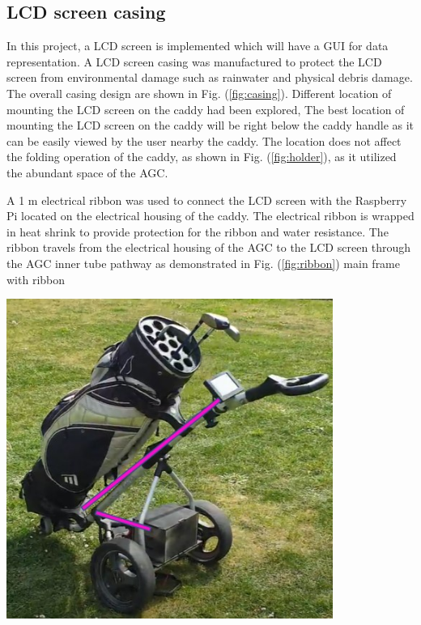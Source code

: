 \documentclass[11pt,landscape]{article}
\newenvironment{Figure}
  {\par\medskip\noindent\minipage{\linewidth}}
  {\endminipage\par\medskip}
\begin{document}
\begin{multicols}{3}
    \subsection{LCD screen casing}
    In this project, a LCD screen is implemented which will have a GUI for data
    representation. A LCD screen casing was manufactured to protect the LCD
    screen from environmental damage such as rainwater and physical debris
    damage. The overall casing design are shown in Fig. (\ref{fig:casing}).
    Different location of mounting the LCD screen on the caddy had been
    explored, The best location of mounting the LCD screen on the caddy will be
    right below the caddy handle as it can be easily viewed by the user nearby
    the caddy. The location does not affect the folding operation of the caddy,
    as shown in Fig. (\ref{fig:holder}), as it utilized the abundant space of
    the AGC. 
    
    A 1 m electrical ribbon was used to connect the LCD screen with the
    Raspberry Pi located on the electrical housing of the caddy. The electrical
    ribbon is wrapped in heat shrink to provide protection for the ribbon and water
    resistance. The ribbon travels from the electrical housing of the AGC to
    the LCD screen through the AGC inner tube pathway as demonstrated in
     Fig. (\ref{fig:ribbon}) main frame with ribbon

    \begin{Figure}
        \begin{center}
            \includegraphics[width=0.8\textwidth]{Figure33.jpg}
            \label{fig:ribbon}
        \end{center}
    \end{Figure}
    

\end{multicols}
\end{document}

